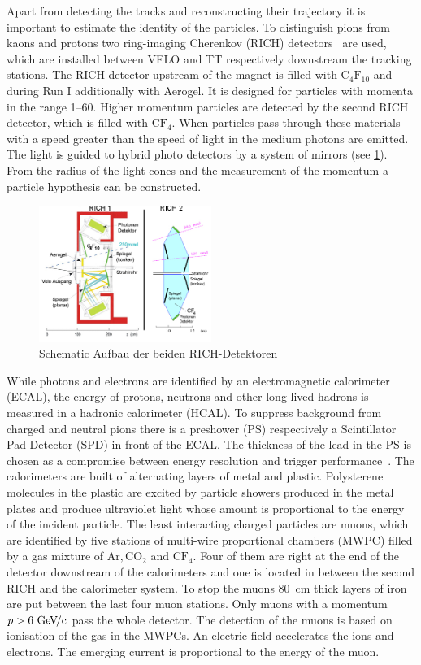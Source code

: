 Apart from detecting the tracks and reconstructing their trajectory it is
important to estimate the identity of the particles. To distinguish pions from
kaons and protons two ring-imaging Cherenkov (RICH)
detectors~\cite{LHCb-DP-2012-003} are used, which are installed between VELO
and TT respectively downstream the tracking stations. The RICH detector
upstream of the magnet is filled with $\mathrm{C_4F_{10}}$ and during Run I
additionally with Aerogel. It is designed for particles with momenta in the
range \SIrange{1}{60}{\gevc}. Higher momentum particles are detected by the
second RICH detector, which is filled with $\mathrm{CF_4}$. When particles
pass through these materials with a speed greater than the speed of light in
the medium photons are emitted. The light is guided to hybrid photo detectors
by a system of mirrors (see \cref{fig:detector:rich}). From the radius of the
light cones and the measurement of the momentum a particle hypothesis can be
constructed.
\begin{figure}[!htb]
\centering
\includegraphics[width=0.50\textwidth]{04-Detector/figs/RICHSchema.jpg}
\caption{Schematic Aufbau der beiden RICH-Detektoren~\cite{Alves:2008zz}}
\label{fig:detector:rich}
\end{figure}
While photons and electrons are identified by an electromagnetic calorimeter
(ECAL), the energy of protons, neutrons and other long-lived hadrons is
measured in a hadronic calorimeter (HCAL). To suppress background from charged
and neutral pions there is a preshower (PS) respectively a Scintillator Pad
Detector (SPD) in front of the ECAL. The thickness of the lead in the PS is
chosen as a compromise between energy resolution and trigger
performance~\cite{Preshower}. The calorimeters are built of alternating layers
of metal and plastic. Polysterene molecules in the plastic are excited by
particle showers produced in the metal plates and produce ultraviolet light
whose amount is proportional to the energy of the incident particle. The least
interacting charged particles are muons, which are identified by five stations
of multi-wire proportional chambers (MWPC) filled by a gas mixture of $\mathrm{Ar,
CO_2}$ and $\mathrm{CF_4}$. Four of them are right at the end of the detector
downstream of the calorimeters and one is located in between the second RICH
and the calorimeter system. To stop the muons \SI{80}{cm} thick layers of iron
are put between the last four muon stations. Only muons with a momentum $p >
\SI{6}{\ensuremath{{\mathrm{\,Ge\kern -0.1em V\!/}c}}}$ pass the whole detector. The detection of the muons is based on
ionisation of the gas in the MWPCs. An electric field accelerates the ions and
electrons. The emerging current is proportional to the energy of the muon.

